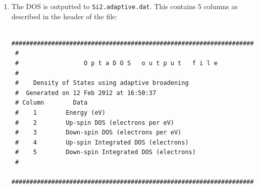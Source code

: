 \documentclass[a4paper,11pt,twoside]{book}
\begin{document}
{\begin{enumerate}
Since we had \verb#efermi_choice : optados#, \optados\ sets the internal value of the Fermi level to the one it has derived from the DOS. This is important for subsequent calculations. Other valid options are \verb#file#, where \optados\ uses the value calculated by the electronic structure code that generated the eigenvalues;  \verb#insulator#, where \optados\ uses a value calculated from assuming the system is non-metallic; or a value set by the user.

\optados\ now performs some analysis of the DOS at the Fermi level,
\begin{verbatim}
+----------------------- DOS at Fermi Energy Analysis ----------------+
|                          Fermi energy used :   5.4109 eV            |
| From Adaptive broadening                                            |
|   Spin Component : 1   DOS at Fermi Energy :   0.0011 eln/cell      | <- DEA
|   Spin Component : 2   DOS at Fermi Energy :   0.0011 eln/cell      | <- DEA
+---------------------------------------------------------------------+
\end{verbatim}
From this we may assume that there is a band gap.

Importantly, then \optados\ calculates the band energy from the DOS is has calculated.
\begin{verbatim}
 +--------------------------- Band Energy Analysis --------------------+
 |          Band energy (Adaptive broadening) :       1.3609 eV        | <- BEA
 |                  Band energy (From CASTEP) :       1.3622 eV        | <- BEC
 +---------------------------------------------------------------------+
\end{verbatim}
As the quality of the \optados\ calculation is increased these two values should converge to the same answer.

Finally \optados\ shifts the Fermi level to 0\,eV, for the output files.

\item  The DOS is outputted to {\tt Si2.adaptive.dat}. This contains 5 columns as described in the header of the file:
\begin{verbatim}
 ########################################################################
 #
 #                  O p t a D O S   o u t p u t   f i l e 
 #
 #    Density of States using adaptive broadening
 #  Generated on 12 Feb 2012 at 16:50:37 
 # Column        Data
 #    1        Energy (eV)
 #    2        Up-spin DOS (electrons per eV)
 #    3        Down-spin DOS (electrons per eV)
 #    4        Up-spin Integrated DOS (electrons)
 #    5        Down-spin Integrated DOS (electrons)
 #
 ########################################################################
\end{verbatim}


\end{enumerate}}
\end{document}
